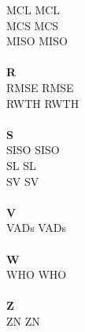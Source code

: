 \begin{tabbing}
\acs{MCL}       \> \acl{MCL} \\
\acs{MCS}       \> \acl{MCS} \\
\acs{MISO}       \> \acl{MISO}\\
\\
\textbf{R}\\
\acs{RMSE}       \> \acl{RMSE}\\
\acs{RWTH}       \> \acl{RWTH}\\
\\
\textbf{S}\\
\acs{SISO}       \> \acl{SISO}\\
\acs{SL}       \> \acl{SL}\\
\acs{SV}       \> \acl{SV} \\
\\
\textbf{V}\\
\acs{VADs}       \> \acl{VADs} \\
\\
\textbf{W}\\
\acs{WHO}       \> \acl{WHO} \\
\\
\textbf{Z}\\
\acs{ZN}       \> \acl{ZN} \\
\end{tabbing}
%
%
%
%
%
%
%
